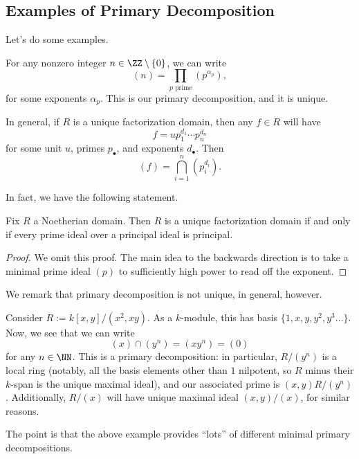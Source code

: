 \subsection{Examples of Primary Decomposition}
Let's do some examples.
\begin{example}
	For any nonzero integer $n\in\ZZ\setminus\{0\}$, we can write
	\[(n)=\prod_{p\text{ prime}}\left(p^{\alpha_p}\right),\]
	for some exponents $\alpha_p$. This is our primary decomposition, and it is unique.
\end{example}
\begin{example}
	In general, if $R$ is a unique factorization domain, then any $f\in R$ will have
	\[f=up_1^{d_1}\cdots p_n^{d_n}\]
	for some unit $u$, primes $p_\bullet$, and exponents $d_\bullet$. Then
	\[(f)=\bigcap_{i=1}^n\left(p_i^{d_i}\right).\]
\end{example}
In fact, we have the following statement.
\begin{proposition}
	Fix $R$ a Noetherian domain. Then $R$ is a unique factorization domain if and only if every prime ideal over a principal ideal is principal.
\end{proposition}
\begin{proof}
	We omit this proof. The main idea to the backwards direction is to take a minimal prime ideal $(p)$ to sufficiently high power to read off the exponent.
\end{proof}

We remark that primary decomposition is not unique, in general, however.
\begin{example}
	Consider $R:=k[x,y]/\left(x^2,xy\right)$. As a $k$-module, this has basis $\{1,x,y,y^2,y^3\ldots\}$. Now, we see that we can write
	\[(x)\cap\left(y^n\right)=\left(xy^n\right)=(0)\]
	for any $n\in\NN$. This is a primary decomposition: in particular, $R/\left(y^n\right)$ is a local ring (notably, all the basis elements other than $1$ nilpotent, so $R$ minus their $k$-span is the unique maximal ideal), and our associated prime is $(x,y)R/\left(y^n\right)$. Additionally, $R/(x)$ will have unique maximal ideal $(x,y)/(x)$, for similar reasons.
\end{example}
The point is that the above example provides ``lots'' of different minimal primary decompositions.

